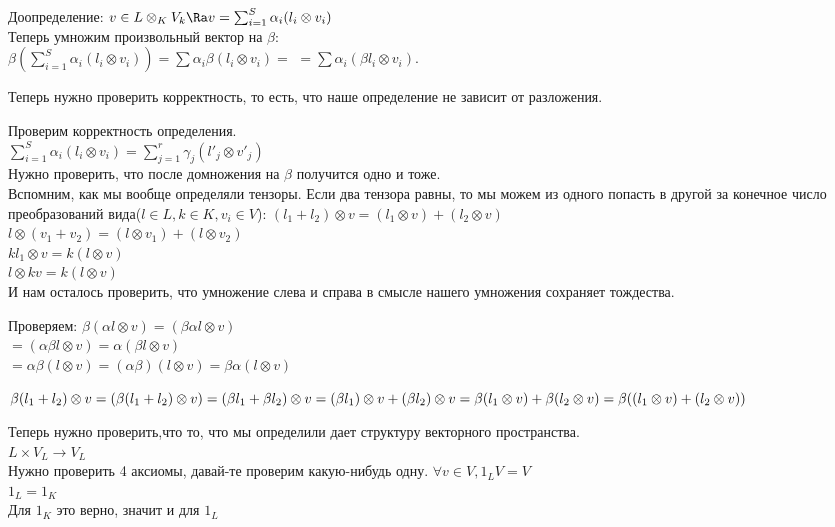 \begin{enumerate}
Доопределение:
$v \in L \otimes_K V_k \Ra v = \sum_{i = 1}^{S}\alpha_i (l_i \otimes v_i)$\\
Теперь умножим произвольный вектор на $\beta:$\\
$\beta (\sum_{i = 1}^{S}\alpha_i(l_i \otimes v_i)) = \sum \alpha_i \beta(l_i \otimes v_i) = $
$= \sum \alpha_i(\beta l_i \otimes v_i)$.

Теперь нужно проверить корректность, то есть, 
что наше определение не зависит от разложения.

Проверим корректность определения.\\
$\sum_{i = 1}^{S}\alpha_i(l_i \otimes v_i) = \sum_{j = 1}^{r}\gamma_j(l'_j \otimes v'_j)$\\
Нужно проверить, что после домножения на $\beta$ получится одно и тоже.\\

Вспомним, как мы вообще определяли тензоры. Если два тензора равны, то мы можем из 
одного попасть в другой за конечное число преобразований вида($l \in L, k \in K, v_i \in V$):
$(l_1 + l_2)\otimes v = (l_1 \otimes v) + (l_2\otimes v)$ \\
$l\otimes(v_1 + v_2) = (l\otimes v_1) + (l \otimes v_2)$ \\
$kl_1 \otimes v =  k(l\otimes v)$\\ 
$l\otimes kv = k(l\otimes v)$\\

И нам осталось проверить, что умножение слева и справа в смысле нашего умножения
сохраняет тождества.

Проверяем:
$\beta(\alpha l \otimes v) = (\beta \alpha l \otimes v)$\\
$= (\alpha \beta l \otimes v) = \alpha (\beta l \otimes v)$\\
$= \alpha \beta(l \otimes v) = (\alpha \beta)(l \otimes v) = \beta \alpha (l \otimes v)$

$\beta(l_1 + l_2)\otimes v = (\beta(l_1 + l_2) \otimes v) = (\beta l_1 + \beta l_2)\otimes v = \\
(\beta l_1) \otimes v + (\beta l_2) \otimes v = \beta(l_1 \otimes v)+ \beta(l_2 \otimes v) = \beta((l_1 \otimes v) + (l_2 \otimes v))$                                       

Теперь нужно проверить,что то, что мы определили дает структуру векторного пространства.\\ 
$L \times V_L \to V_L$\\
Нужно проверить 4 аксиомы, давай-те проверим какую-нибудь одну. 
$\forall v \in V, 1_L V = V$\\
$1_L = 1_K$\\
Для $1_K$ это верно, значит и для $1_L$\\


\end{enumerate}
